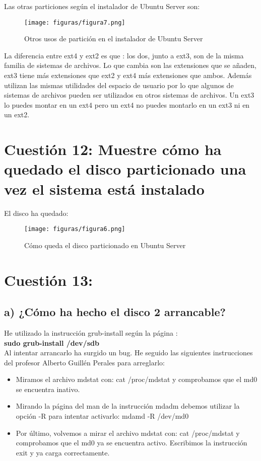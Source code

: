 Las otras particiones según el instalador de Ubuntu Server son: 
\begin{figure}[H] %
	\centering
	\texttt{[image: figuras/figura7.png]}  %
	\label{figura7}
	
	\caption{Otros usos de partición en el instalador de Ubuntu Server \cite{ubuntuserver}} 
\end{figure}

La diferencia entre ext4 y ext2 es que \cite{ext2ext4}:
los dos, junto a ext3, son de la misma familia de sistemas de archivos. Lo que cambia son las extensiones que se añaden, ext3 tiene más extensiones que ext2 y ext4 más extensiones que ambos. Además utilizan las mismas utilidades del espacio de usuario por lo que algunos de sistemas de archivos pueden ser utilizados en otros sistemas de archivos. Un ext3 lo puedes montar en un ext4 pero un ext4 no puedes montarlo en un ext3 ni en un ext2.

\section{Cuestión 12: Muestre cómo ha quedado el disco particionado una vez el sistema está instalado}
El disco ha quedado:
\begin{figure}[H] %
	\centering
	\texttt{[image: figuras/figura6.png]}  %
	\label{figura6}
	
	\caption{Cómo queda el disco particionado en Ubuntu Server \cite{ubuntuserver}} 
\end{figure}

\section{Cuestión 13:}
\subsection{a) ¿Cómo ha hecho el disco 2 arrancable?}
He utilizado la instrucción grub-install según la página \cite{grub-install-gnu}:\\
\textbf{sudo grub-install /dev/sdb} \\
Al intentar arrancarlo ha surgido un bug. He seguido las siguientes instrucciones del profesor Alberto Guillén Perales \cite{alberto} para arreglarlo:
\begin{itemize}
	\item Miramos el archivo mdstat con: cat /proc/mdstat y comprobamos que el md0 se encuentra inativo.
	\item Mirando la página del man de la instrucción mdadm \cite{mdadm} debemos utilizar la opción -R para intentar activarlo: mdamd -R /dev/md0
	\item Por último, volvemos a mirar el archivo mdstat con: cat /proc/mdstat y comprobamos que el md0 ya se encuentra activo. Escribimos la instrucción exit y ya carga correctamente.
\end{itemize}
